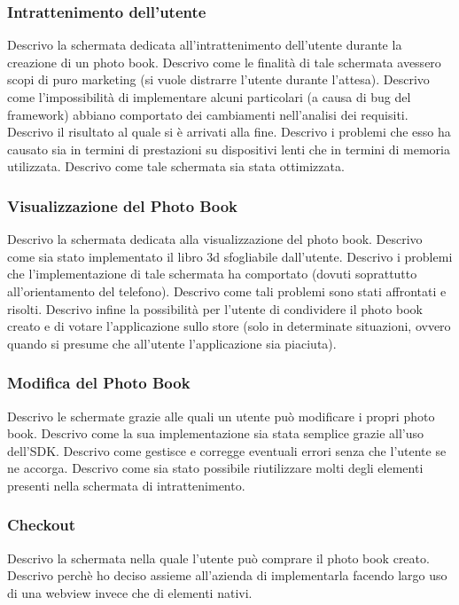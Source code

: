 			\subsubsection{Intrattenimento dell'utente}
				Descrivo la schermata dedicata all'intrattenimento dell'utente durante la creazione di un photo book. Descrivo come
				le finalità di tale schermata avessero scopi di puro marketing (si vuole distrarre l'utente durante l'attesa).
				Descrivo come l'impossibilità di implementare alcuni particolari (a causa di bug del framework) abbiano comportato
				dei cambiamenti nell'analisi dei requisiti. Descrivo il risultato al quale si è arrivati alla fine. Descrivo i
				problemi che esso ha causato sia in termini di prestazioni su dispositivi lenti che in termini di memoria utilizzata.
				Descrivo come tale schermata sia stata ottimizzata.
			\subsubsection{Visualizzazione del Photo Book}
				Descrivo la schermata dedicata alla visualizzazione del photo book. Descrivo come sia stato implementato il libro
				3d sfogliabile dall'utente. Descrivo i problemi che l'implementazione di tale schermata ha comportato (dovuti
				soprattutto all'orientamento del telefono). Descrivo come tali problemi sono stati affrontati e risolti. Descrivo
				infine la possibilità per l'utente di condividere il photo book creato e di votare l'applicazione sullo store
				(solo in determinate situazioni, ovvero quando si presume che all'utente l'applicazione sia piaciuta).
			\subsubsection{Modifica del Photo Book}
				Descrivo le schermate grazie alle quali un utente può modificare i propri photo book. Descrivo come la sua
				implementazione sia stata semplice grazie all'uso dell'SDK. Descrivo come gestisce e corregge eventuali errori senza
				che l'utente se ne accorga. Descrivo come sia stato possibile riutilizzare molti degli elementi presenti nella
				schermata di intrattenimento.
			\subsubsection{Checkout}
				Descrivo la schermata nella quale l'utente può comprare il photo book creato. Descrivo perchè ho deciso assieme
				all'azienda di implementarla facendo largo uso di una webview invece che di elementi nativi.
